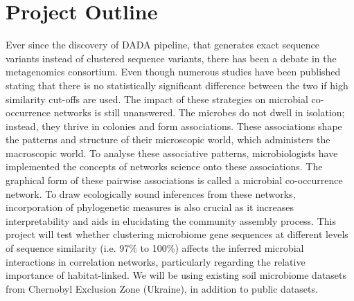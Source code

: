 \chapter{Project Outline}
 \setcounter{page}{24}


Ever since the discovery of DADA pipeline, that generates exact sequence variants instead of clustered sequence variants, there has been a debate in the metagenomics consortium. Even though numerous studies have been published stating that there is no statistically significant difference between the two if high similarity cut-offs are used. The impact of these strategies on microbial co-occurrence networks is still unanswered. The microbes do not dwell in isolation; instead, they thrive in colonies and form associations. These associations shape the patterns and structure of their microscopic world, which administers the macroscopic world. To analyse these associative patterns, microbiologists have implemented the concepts of networks science onto these associations. The graphical form of these pairwise associations is called a microbial co-occurrence network. To draw ecologically sound inferences from these networks, incorporation of phylogenetic measures is also crucial as it increases interpretability and aids in elucidating the community assembly process. This project will test whether clustering microbiome gene sequences at different levels of sequence similarity (i.e. 97\% to 100\%) affects the inferred microbial interactions in correlation networks, particularly regarding the relative importance of habitat-linked. We will be using existing soil microbiome datasets from Chernobyl Exclusion Zone (Ukraine), in addition to public datasets.